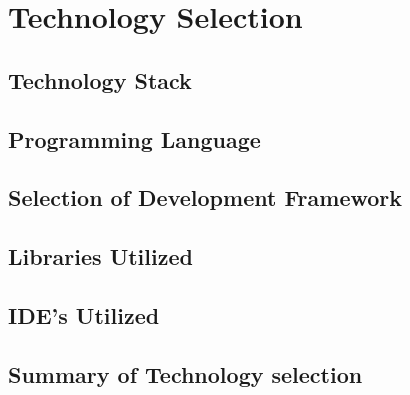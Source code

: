 \section{Technology Selection}
\subsection{Technology Stack}
\subsection{Programming Language}
\subsection{Selection of Development Framework}
\subsection{Libraries Utilized}
\subsection{IDE’s Utilized}
\subsection{Summary of Technology selection}